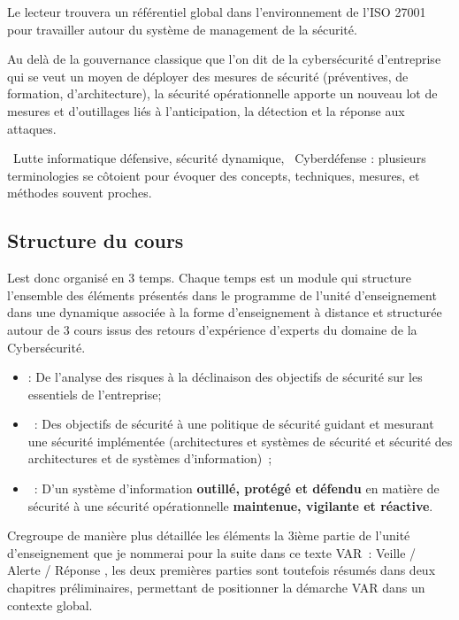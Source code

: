 Le lecteur trouvera un référentiel global dans l'environnement de l'ISO 27001 pour travailler autour du système de management de la sécurité.

Au delà de la gouvernance classique que l'on dit  de la cybersécurité d'entreprise qui se veut un moyen de déployer des mesures de sécurité (préventives, de formation, d'architecture), la sécurité opérationnelle apporte un nouveau lot de mesures et d'outillages liés à l'anticipation, la détection et la réponse aux attaques.

\begin{nota} Lutte informatique défensive, sécurité dynamique, 
Cyberdéfense : plusieurs terminologies se côtoient pour évoquer des concepts, techniques, mesures, et méthodes souvent proches. 
\end{nota}


\subsection{Structure du cours}

L\ecours est donc organisé en 3 temps. Chaque temps est un module qui structure l'ensemble des éléments présentés dans le programme de l'unité d'enseignement dans une dynamique associée à la forme d'enseignement à distance et structurée autour de 3 cours issus des retours d'expérience d'experts du domaine de la Cybersécurité.  
\begin{itemize}
\item {} : De l'analyse des risques à la déclinaison des objectifs de sécurité sur les essentiels de l'entreprise;
\item {} : Des objectifs de sécurité à une politique de sécurité guidant et mesurant une sécurité implémentée (architectures et systèmes  de sécurité et sécurité des architectures et de systèmes d'information) ;
\item {} : D'un système d'information \textbf{outillé, protégé et défendu} en matière de sécurité à une sécurité opérationnelle \textbf{maintenue, vigilante et  réactive}.
\end{itemize}

C\edoc regroupe de manière plus détaillée les éléments la 3ième partie de l'unité d'enseignement que je nommerai pour la suite dans ce texte   VAR : Veille / Alerte / Réponse ,  les deux premières parties sont toutefois résumés dans deux chapitres préliminaires, permettant de positionner la démarche VAR dans un contexte global.

